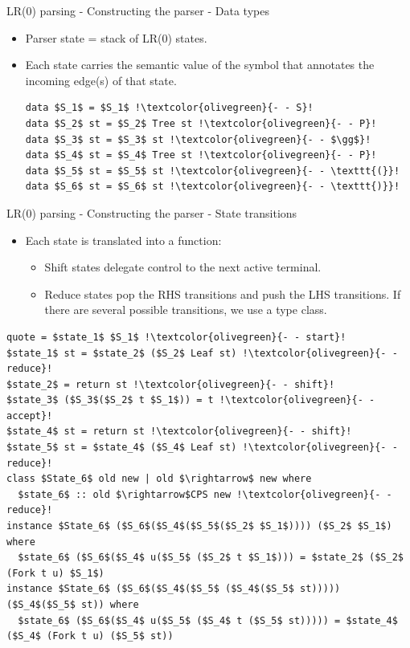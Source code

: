 \documentclass[10pt]{beamer}
\begin{document}
\begin{frame}[fragile]{LR(0) parsing - Constructing the parser - Data types}

\begin{itemize}

\item Parser state = stack of LR(0) states.
\item Each state carries the semantic value of the symbol that annotates the incoming edge(s) of that state.

\begin{lstlisting}[mathescape=true, escapechar=!]
data $S_1$ = $S_1$ !\textcolor{olivegreen}{- - S}!
data $S_2$ st = $S_2$ Tree st !\textcolor{olivegreen}{- - P}!
data $S_3$ st = $S_3$ st !\textcolor{olivegreen}{- - $\gg$}!
data $S_4$ st = $S_4$ Tree st !\textcolor{olivegreen}{- - P}!
data $S_5$ st = $S_5$ st !\textcolor{olivegreen}{- - \texttt{(}}!
data $S_6$ st = $S_6$ st !\textcolor{olivegreen}{- - \texttt{)}}!
\end{lstlisting}

\end{itemize}

\end{frame}

\begin{frame}[fragile]{LR(0) parsing - Constructing the parser - State transitions}

\begin{itemize}

\item Each state is translated into a function:
\begin{itemize}
\item Shift states delegate control to the next active terminal.
\item Reduce states pop the RHS transitions and push the LHS transitions. If there are several possible transitions, we use a type class.
\end{itemize}

\end{itemize}

\begin{lstlisting}[mathescape=true, escapechar=!,basicstyle=\small]
quote = $state_1$ $S_1$ !\textcolor{olivegreen}{- - start}!
$state_1$ st = $state_2$ ($S_2$ Leaf st) !\textcolor{olivegreen}{- - reduce}!
$state_2$ = return st !\textcolor{olivegreen}{- - shift}!
$state_3$ ($S_3$($S_2$ t $S_1$)) = t !\textcolor{olivegreen}{- - accept}!
$state_4$ st = return st !\textcolor{olivegreen}{- - shift}!
$state_5$ st = $state_4$ ($S_4$ Leaf st) !\textcolor{olivegreen}{- - reduce}!
class $State_6$ old new | old $\rightarrow$ new where
  $state_6$ :: old $\rightarrow$CPS new !\textcolor{olivegreen}{- - reduce}!
instance $State_6$ ($S_6$($S_4$($S_5$($S_2$ $S_1$)))) ($S_2$ $S_1$) where
  $state_6$ ($S_6$($S_4$ u($S_5$ ($S_2$ t $S_1$))) = $state_2$ ($S_2$ (Fork t u) $S_1$)
instance $State_6$ ($S_6$($S_4$($S_5$ ($S_4$($S_5$ st))))) ($S_4$($S_5$ st)) where
  $state_6$ ($S_6$($S_4$ u($S_5$ ($S_4$ t ($S_5$ st))))) = $state_4$ ($S_4$ (Fork t u) ($S_5$ st))
\end{lstlisting}

\end{frame}
\end{document}
